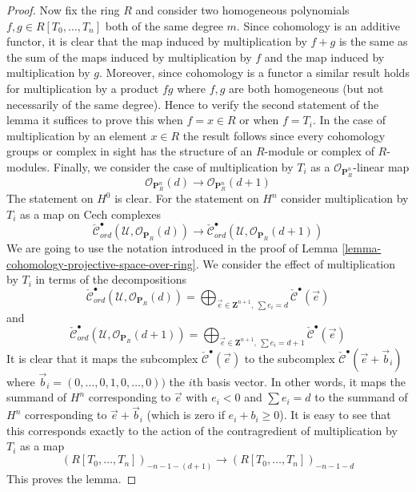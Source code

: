 \begin{proof}
\medskip\noindent
Now fix the ring $R$ and consider two homogeneous polynomials
$f, g \in R[T_0, \ldots, T_n]$ both of the same degree $m$.
Since cohomology is an additive functor, it is clear that the
map induced by multiplication by $f + g$ is the same as the sum
of the maps induced by multiplication by $f$ and the map induced
by multiplication by $g$. Moreover, since cohomology is a functor
a similar result holds for multiplication by a product $fg$ where
$f, g$ are both homogeneous (but not necessarily of the same degree).
Hence to verify the second statement of the lemma it suffices to
prove this when $f = x \in R$ or when $f = T_i$.
In the case of multiplication by an element $x \in R$ the result
follows since every cohomology groups or complex in sight has the
structure of an $R$-module or complex of $R$-modules.
Finally, we consider the case of multiplication by $T_i$
as a $\mathcal{O}_{\mathbf{P}^n_R}$-linear map
$$
\mathcal{O}_{\mathbf{P}^n_R}(d)
\longrightarrow
\mathcal{O}_{\mathbf{P}^n_R}(d + 1)
$$
The statement on $H^0$ is clear. For the statement on $H^n$
consider multiplication by $T_i$ as a map on Cech complexes
$$
\check{\mathcal{C}}_{ord}^\bullet(\mathcal{U},
\mathcal{O}_{\mathbf{P}_R}(d))
\longrightarrow
\check{\mathcal{C}}_{ord}^\bullet(\mathcal{U},
\mathcal{O}_{\mathbf{P}_R}(d + 1))
$$
We are going to use the notation introduced in the proof of
Lemma \ref{lemma-cohomology-projective-space-over-ring}.
We consider the effect of multiplication by $T_i$
in terms of the decompositions
$$
\check{\mathcal{C}}_{ord}^\bullet(\mathcal{U}, \mathcal{O}_{\mathbf{P}_R}(d))
=
\bigoplus\nolimits_{\vec{e} \in \mathbf{Z}^{n + 1}, \ \sum e_i = d}
\check{\mathcal{C}}^\bullet(\vec{e})
$$
and
$$
\check{\mathcal{C}}_{ord}^\bullet(\mathcal{U},
\mathcal{O}_{\mathbf{P}_R}(d + 1))
=
\bigoplus\nolimits_{\vec{e} \in \mathbf{Z}^{n + 1}, \ \sum e_i = d + 1}
\check{\mathcal{C}}^\bullet(\vec{e})
$$
It is clear that it maps the subcomplex
$\check{\mathcal{C}}^\bullet(\vec{e})$ to the subcomplex
$\check{\mathcal{C}}^\bullet(\vec{e} + \vec{b}_i)$ where
$\vec{b}_i = (0, \ldots, 0, 1, 0, \ldots, 0))$ the $i$th basis vector.
In other words, it maps the summand of $H^n$ corresponding to
$\vec{e}$ with $e_i < 0$ and $\sum e_i = d$
to the summand of $H^n$ corresponding to
$\vec{e} + \vec{b}_i$ (which is zero if $e_i + b_i \geq 0$).
It is easy to see that this corresponds exactly to the action
of the contragredient of multiplication by $T_i$ as a map
$$
(R[T_0, \ldots, T_n])_{-n - 1 - (d + 1)}
\longrightarrow
(R[T_0, \ldots, T_n])_{-n - 1 - d}
$$
This proves the lemma.
\end{proof}

